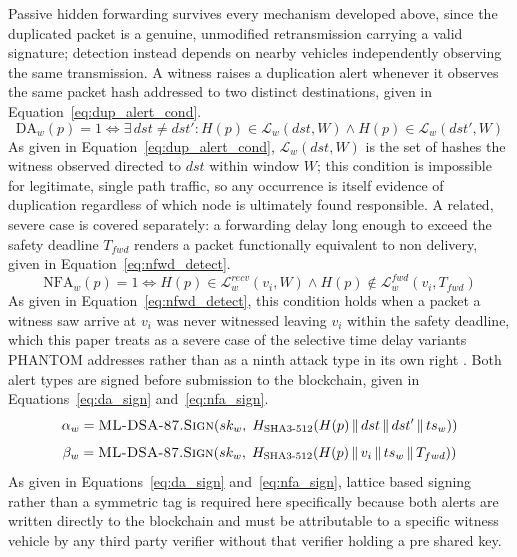 \documentclass[final,5p,twocolumn]{elsarticle}
\theoremstyle{remark}
\theoremstyle{plain}
\begin{document}
Passive hidden forwarding survives every mechanism developed above, since
the duplicated packet is a genuine, unmodified retransmission carrying a
valid signature; detection instead depends on nearby vehicles independently
observing the same transmission. A witness raises a duplication alert
whenever it observes the same packet hash addressed to two distinct
destinations, given in Equation~\eqref{eq:dup_alert_cond}.
\begin{equation}
	\text{DA}_w(p){=}1\iff \exists\,dst{\neq}dst': H(p)\in\mathcal{L}_w(dst,W) \land H(p)\in\mathcal{L}_w(dst',W)
	\label{eq:dup_alert_cond}
\end{equation}
As given in Equation~\eqref{eq:dup_alert_cond}, $\mathcal{L}_w(dst,W)$ is the
set of hashes the witness observed directed to $dst$ within window $W$; this
condition is impossible for legitimate, single path traffic, so any
occurrence is itself evidence of duplication regardless of which node is
ultimately found responsible. A related, severe case is covered separately:
a forwarding delay long enough to exceed the safety deadline $T_{fwd}$
renders a packet functionally equivalent to non delivery, given in
Equation~\eqref{eq:nfwd_detect}.
\begin{equation}
	\text{NFA}_w(p){=}1\iff H(p)\in\mathcal{L}_w^{recv}(v_i,W) \land H(p)\notin\mathcal{L}_w^{fwd}(v_i,T_{fwd})
	\label{eq:nfwd_detect}
\end{equation}
As given in Equation~\eqref{eq:nfwd_detect}, this condition holds when a
packet a witness saw arrive at $v_i$ was never witnessed leaving $v_i$
within the safety deadline, which this paper treats as a severe case of the
selective time delay variants PHANTOM addresses rather than as a ninth
attack type in its own right \cite{Phantom2026}. Both alert types are signed
before submission to the blockchain, given in Equations~\eqref{eq:da_sign}
and~\eqref{eq:nfa_sign}.
\begin{equation}
	\alpha_w = \textsc{ML-DSA-87.Sign}\!\left(sk_w,\; H_{\text{SHA3-512}}\!\left(H(p) \,\|\, dst \,\|\, dst' \,\|\, ts_w\right)\right)
	\label{eq:da_sign}
\end{equation}
\begin{equation}
	\beta_w = \textsc{ML-DSA-87.Sign}\!\left(sk_w,\; H_{\text{SHA3-512}}\!\left(H(p) \,\|\, v_i \,\|\, ts_w \,\|\, T_{fwd}\right)\right)
	\label{eq:nfa_sign}
\end{equation}
As given in Equations~\eqref{eq:da_sign} and~\eqref{eq:nfa_sign}, lattice
based signing rather than a symmetric tag is required here specifically
because both alerts are written directly to the blockchain and must be
attributable to a specific witness vehicle by any third party verifier
without that verifier holding a pre shared key.
\end{document}
